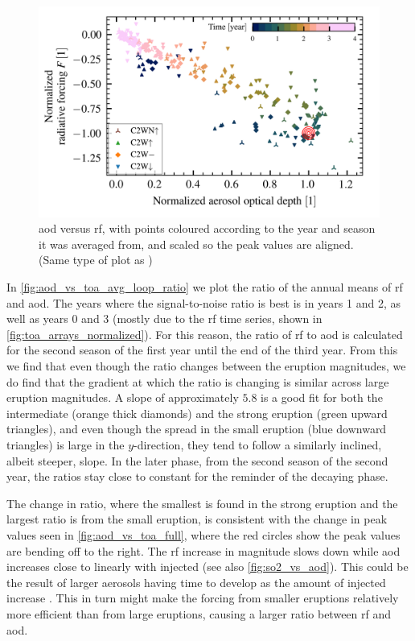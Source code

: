 \documentclass[twocol]{ametsocV5}
\begin{document}
\begin{figure}[t]
  \begin{center}
    \includegraphics[width=0.95\linewidth]{figures/aod_vs_toa_avg_loop_scaled.png}
  \end{center}
  \caption{
    \acrshort{aod} versus \acrshort{rf}, with points coloured according to the year and
    season it was averaged from, and scaled so the peak values are aligned. (Same type
    of plot as \citet{gregory2016})
  }%
  \label{fig:aod_vs_toa_avg_loop_scaled}
\end{figure}

In \cref{fig:aod_vs_toa_avg_loop_ratio} we plot the ratio of the annual means of
\acrshort{rf} and \acrshort{aod}. The years where the signal-to-noise ratio is best is
in years 1 and 2, as well as years 0 and 3 (mostly due to the \acrshort{rf} time series,
shown in \cref{fig:toa_arrays_normalized}). For this reason, the ratio of \acrshort{rf}
to \acrshort{aod} is calculated for the second season of the first year until the end of
the third year. From this we find that even though the ratio changes between the
eruption magnitudes, we do find that the gradient at which the ratio is changing is
similar across large eruption magnitudes. A slope of approximately \( 5.8 \) is a good
fit for both the intermediate (orange thick diamonds) and the strong eruption (green
upward triangles), and even though the spread in the small eruption (blue downward
triangles) is large in the \( y \)-direction, they tend to follow a similarly inclined,
albeit steeper, slope. In the later phase, from the second season of the second year,
the ratios stay close to constant for the reminder of the decaying phase.

The change in ratio, where the smallest is found in the strong eruption and the largest
ratio is from the small eruption, is consistent with the change in peak values seen in
\cref{fig:aod_vs_toa_full}, where the red circles show the peak values are bending off
to the right. The \acrshort{rf} increase in magnitude slows down while \acrshort{aod}
increases close to linearly with injected  (see also \cref{fig:so2_vs_aod}).
This could be the result of larger aerosols having time to develop as the amount of
injected  increase \citep{marshall2019}. This in turn might make the forcing
from smaller eruptions relatively more efficient than from large eruptions, causing a
larger ratio between \acrshort{rf} and \acrshort{aod}.
\end{document}
